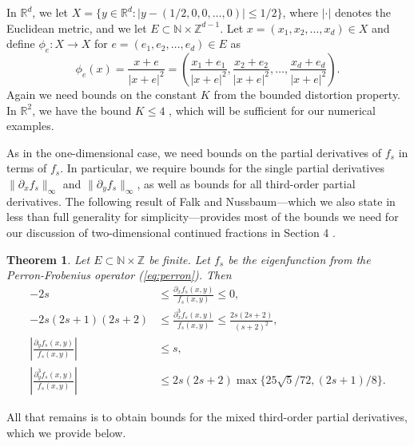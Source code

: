 \documentclass[10pt]{article}
\newtheorem{theorem}{Theorem}[section]
\theoremstyle{definition}
\numberwithin{equation}{section}
\numberwithin{figure}{section}
\numberwithin{table}{section}
\begin{document}
In $\mathbb{R}^d$, we let $X=\{y\in\mathbb{R}^d:|y-(1/2,0,0,\dots,0)|\leq 1/2\}$, where $|\cdot |$ denotes the Euclidean metric, and we let $E\subset\mathbb{N}\times \mathbb{Z}^{d-1}$. Let $x=(x_1,x_2,\dots,x_d)\in X$ and define $\phi_e:X\to X$ for $e=(e_1,e_2,\dots,e_d)\in E$ as
$$\phi_e(x)=\frac{x+e}{|x+e|^2}=\left(\frac{x_1+e_1}{|x+e|^2},\frac{x_2+e_2}{|x+e|^2},\dots,\frac{x_d+e_d}{|x+e|^2}\right).$$
Again we need bounds on the constant $K$ from the bounded distortion property. In $\mathbb{R}^2$, we have the bound $K\leq4$ \cite{mauldin1996dimensions}, which will be sufficient for our numerical examples.%

As in the one-dimensional case, we need bounds on the partial derivatives of $f_s$ in terms of $f_s$. In particular, we require bounds for the single partial derivatives $\|\partial_xf_s\|_\infty$ and $\|\partial_yf_s\|_\infty$, as well as bounds for all third-order partial derivatives. The following result of Falk and Nussbaum—which we also state in less than full generality for simplicity—provides most of the bounds we need for our discussion of two-dimensional continued fractions in Section 4 \cite{falk2018new}. 
\begin{theorem}
Let $E\subset\mathbb{N}\times\mathbb{Z}$ be finite. Let $f_s$ be the eigenfunction from the Perron-Frobenius operator (\ref{eq:perron}). Then
\begin{align}
-2s&\leq\frac{\partial_xf_s(x,y)}{f_s(x,y)}\leq0,\\
-2s(2s+1)(2s+2)&\leq\frac{\partial^{3}_xf_s(x,y)}{f_s(x,y)}\leq\frac{2s(2s+2)}{(s+2)^2},\\
\left|\frac{\partial_yf_s(x,y)}{f_s(x,y)}\right|&\leq s,\\
\left|\frac{\partial^3_yf_s(x,y)}{f_s(x,y)}\right|&\leq 2s(2s+2)\max\{25\sqrt5/72,(2s+1)/8\}.
\end{align}
\label{thm:falk_deriv_bounds}
\end{theorem}

All that remains is to obtain bounds for the mixed third-order partial derivatives, which we provide below.
\end{document}
